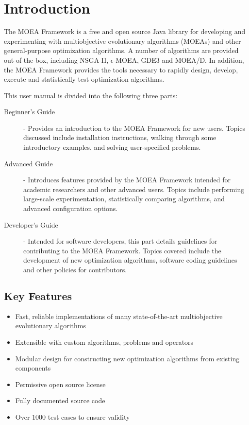 %
%

\chapter{Introduction}

The MOEA Framework is a free and open source Java library for developing and experimenting with multiobjective evolutionary algorithms (MOEAs) and other general-purpose optimization algorithms.  A number of algorithms are provided out-of-the-box, including NSGA-II, $\epsilon$-MOEA, GDE3 and MOEA/D.  In addition, the MOEA Framework provides the tools necessary to rapidly design, develop, execute and statistically test optimization algorithms.

This user manual is divided into the following three parts:
\begin{description}
  \item [Beginner's Guide] - Provides an introduction to the MOEA Framework for new users.  Topics discussed include installation instructions, walking through some introductory examples, and solving user-specified problems.
  \item [Advanced Guide] - Introduces features provided by the MOEA Framework intended for academic researchers and other advanced users.  Topics include performing large-scale experimentation, statistically comparing algorithms, and advanced configuration options.
  \item [Developer's Guide] - Intended for software developers, this part details guidelines for contributing to the MOEA Framework.  Topics covered include the development of new optimization algorithms, software coding guidelines and other policies for contributors.
\end{description}

\section{Key Features}

\begin{itemize}
  \item Fast, reliable implementations of many state-of-the-art multiobjective evolutionary algorithms
  \item Extensible with custom algorithms, problems and operators
  \item Modular design for constructing new optimization algorithms from existing components
  \item Permissive open source license
  \item Fully documented source code
  \item Over 1000 test cases to ensure validity
\end{itemize}

